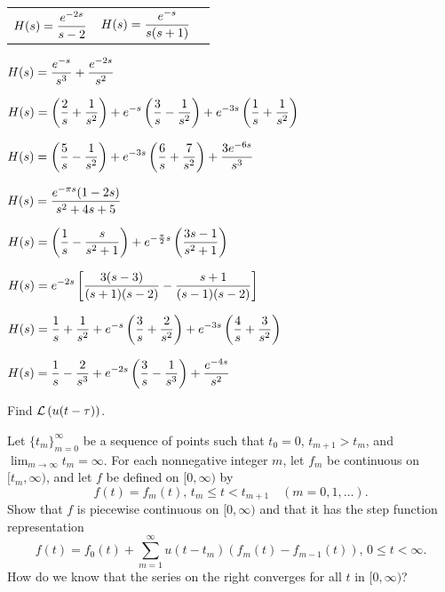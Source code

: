 \begin{exerciselist}
  \begin{tabular}[t]{@{}p{168pt}@{}p{112pt}@{}p{68pt}}
    \item\label{exer:8.4.19} $\displaystyle{H(s)=\frac{e^{-2s}}{s-2}}$ &
    \item\label{exer:8.4.20} $\displaystyle{H(s)=\frac{e^{-s}}{s(s+1)}}$
  \end{tabular}

  \item\label{exer:8.4.21} \CGex $\displaystyle{H(s)=\frac{e^{-s}}{s^{3}}+ \frac{e^{-2s}}{s^{2}}}$

  \item\label{exer:8.4.22} \CGex
        $\displaystyle{H(s)=\left(\frac{2}{s}+\frac{1}{s^{2}}\right) +e^{-s}\left(\frac{3}{s}-\frac{1}{s^{2}}\right)+e^{-3s}\left(\frac{1}{s}+\frac{1}{s^{2}}\right)}$

  \item\label{exer:8.4.23}
        $\displaystyle{H(s)=\left(\frac{5}{s}-\frac{1}{s^{2}}\right) +e^{-3s}\left(\frac{6}{s}+\frac{7}{s^{2}}\right)+\frac{3e^{-6s}}{s^{3}}}$

  \item\label{exer:8.4.24} $\displaystyle{H(s)=\frac{e^{-\pi s}(1-2s)}{s^{2}+4s+5}}$

  \item\label{exer:8.4.25} \CGex
        $\displaystyle{H(s)=\left(\frac{1}{s}-\frac{s}{s^{2}+1}\right)+e^{-\frac{\pi}{2}s}\left(\frac{3s-1}{s^{2}+1}\right)}$

  \item\label{exer:8.4.26}
        $\displaystyle{H(s)= e^{-2s}\left[\frac{3(s-3)}{(s+1)(s-2)}-\frac{s+1}{(s-1)(s-2)}\right]}$

  \item\label{exer:8.4.27}
        $\displaystyle{H(s)=\frac{1}{s}+\frac{1}{s^{2}}+e^{-s}\left(\frac{3}{s}+\frac{2}{s^{2}}\right)+e^{-3s}\left(\frac{4}{s}+\frac{3}{s^{2}}\right)}$

  \item\label{exer:8.4.28}
        $\displaystyle{H(s)=\frac{1}{s}-\frac{2}{s^{3}}+e^{-2s}\left(\frac{3}{s}-\frac{1}{s^{3}}\right)+\frac{e^{-4s}}{s^{2}}}$

  \item\label{exer:8.4.29} Find ${\cal L}\left(u(t-\tau)\right)$.

  \item\label{exer:8.4.30} Let $\{t_{m}\}_{m=0}^{\infty}$ be a sequence of points such that
        $t_{0}=0$, $t_{m+1}>t_{m}$, and $\lim_{m\to\infty}t_{m}=\infty$. For each nonnegative
        integer $m$, let $f_{m}$ be continuous on $[t_{m},\infty)$, and let $f$ be defined on
        $[0,\infty)$ by
  \[
    f(t)=f_{m}(t),\,t_{m}\le t<t_{m+1}\quad(m=0,1,\dots).
  \]
  Show that $f$ is piecewise continuous on $[0,\infty)$ and that it has the step function
  representation
  \[
    f(t)=f_{0}(t)+\sum_{m=1}^{\infty}u(t-t_{m})\left(f_{m}(t)-f_{m-1}(t)\right),\, 0\le t<\infty.
  \]
  How do we know that the series on the right converges for all $t$ in $[0,\infty)$?


\end{exerciselist}
